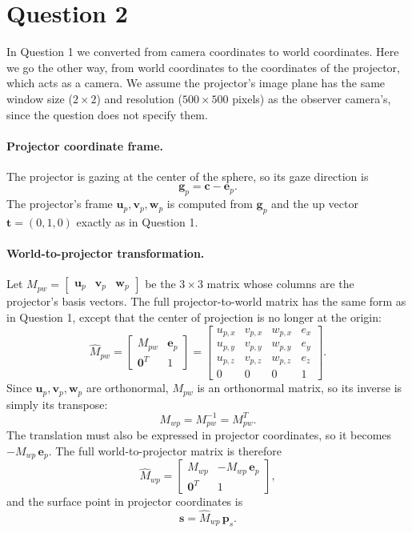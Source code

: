 \documentclass[11pt]{article}
\newcommand{\vect}[1]{\mathbf{#1}}
\begin{document}
\section*{Question 2}

In Question 1 we converted from camera coordinates to world coordinates. Here we go the
other way, from world coordinates to the coordinates of the projector, which acts as a
camera. We assume the projector's image plane has the same window size ($2 \times 2$)
and resolution ($500 \times 500$ pixels) as the observer camera's, since the question does
not specify them.

\paragraph{Projector coordinate frame.}
The projector is gazing at the center of the sphere, so its gaze direction is
\[
  \vect{g}_p = \vect{c} - \vect{e}_p.
\]
The projector's frame $\vect{u}_p, \vect{v}_p, \vect{w}_p$ is computed from $\vect{g}_p$ and
the up vector $\vect{t} = (0, 1, 0)$ exactly as in Question 1.

\paragraph{World-to-projector transformation.}
Let $M_{pw} = \begin{bmatrix} \vect{u}_p & \vect{v}_p & \vect{w}_p \end{bmatrix}$ be the
$3 \times 3$ matrix whose columns are the projector's basis vectors. The full
projector-to-world matrix has the same form as in Question 1, except that the center of
projection is no longer at the origin:
\[
  \hat{M}_{pw} =
  \begin{bmatrix}
    M_{pw} & \vect{e}_p \\
    \vect{0}^T & 1
  \end{bmatrix}
  =
  \begin{bmatrix}
    u_{p,x} & v_{p,x} & w_{p,x} & e_x \\
    u_{p,y} & v_{p,y} & w_{p,y} & e_y \\
    u_{p,z} & v_{p,z} & w_{p,z} & e_z \\
    0       & 0       & 0       & 1
  \end{bmatrix}.
\]
Since $\vect{u}_p, \vect{v}_p, \vect{w}_p$ are orthonormal, $M_{pw}$ is an orthonormal
matrix, so its inverse is simply its transpose:
\[
  M_{wp} = M_{pw}^{-1} = M_{pw}^T.
\]
The translation must also be expressed in projector coordinates, so it becomes
$-M_{wp}\,\vect{e}_p$. The full world-to-projector matrix is therefore
\[
  \hat{M}_{wp} =
  \begin{bmatrix}
    M_{wp} & -M_{wp}\,\vect{e}_p \\
    \vect{0}^T & 1
  \end{bmatrix},
\]
and the surface point in projector coordinates is
\[
  \vect{s} = \hat{M}_{wp}\, \vect{p}_s.
\]
\end{document}
